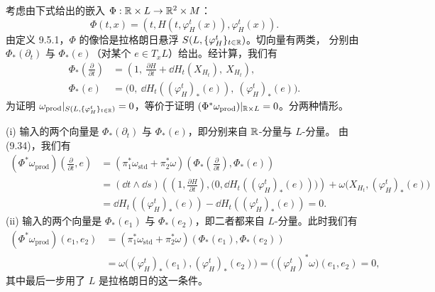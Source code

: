 \begin{wproof}
考虑由下式给出的嵌入 $\Phi:\mathbb{R}\times L\to\mathbb{R}^2\times M$：
\[
  \Phi(t,x)=(t,H(t,\varphi_H^t(x)),\varphi_H^t(x)).
\]
由定义 9.5.1，$\Phi$ 的像恰是拉格朗日悬浮 $S(L,\{\varphi_H^t\}_{t\in\mathbb{R}})$。切向量有两类，
分别由 $\Phi_*(\partial_t)$ 与 $\Phi_*(e)$（对某个 $e\in T_xL$）给出。经计算，我们有
\begin{equation}
  \begin{aligned}
    \Phi_*\left(\frac{\partial}{\partial t}\right)
      &=\left(1,\ \frac{\partial H}{\partial t}+\dd H_t(X_{H_t}),\ X_{H_t}\right),\\
    \Phi_*(e)&=\big(0,\ \dd H_t((\varphi_H^t)_*(e)),\ (\varphi_H^t)_*(e)\big).
  \end{aligned}
  \tag{9.34}
\end{equation}
为证明 $\omega_{\mathrm{prod}}|_{S(L,\{\varphi_H^t\}_{t\in\mathbb{R}})}=0$，等价于证明
$(\Phi^*\omega_{\mathrm{prod}})|_{\mathbb{R}\times L}=0$。分两种情形。

(i) 输入的两个向量是 $\Phi_*(\partial_t)$ 与 $\Phi_*(e)$，即分别来自 $\mathbb{R}$-分量与 $L$-分量。
由 (9.34)，我们有
\[
  \begin{aligned}
    (\Phi^*\omega_{\mathrm{prod}})\left(\frac{\partial}{\partial t},e\right)
    &=(\pi_1^*\omega_{\mathrm{std}}+\pi_2^*\omega)
      \left(\Phi_*\left(\frac{\partial}{\partial t}\right),\Phi_*(e)\right)\\
    &=(\dd t\wedge\dd s)\left(\left(1,\frac{\partial H}{\partial t}\right),
      \big(0,\dd H_t((\varphi_H^t)_*(e))\big)\right)
      +\omega\big(X_{H_t},(\varphi_H^t)_*(e)\big)\\
    &=\dd H_t((\varphi_H^t)_*(e))-\dd H_t((\varphi_H^t)_*(e))=0 .
  \end{aligned}
\]
(ii) 输入的两个向量是 $\Phi_*(e_1)$ 与 $\Phi_*(e_2)$，即二者都来自 $L$-分量。此时我们有
\[
  \begin{aligned}
    (\Phi^*\omega_{\mathrm{prod}})(e_1,e_2)
    &=(\pi_1^*\omega_{\mathrm{std}}+\pi_2^*\omega)(\Phi_*(e_1),\Phi_*(e_2))\\
    &=\omega\big((\varphi_H^t)_*(e_1),(\varphi_H^t)_*(e_2)\big)
      =\big((\varphi_H^t)^*\omega\big)(e_1,e_2)=0,
  \end{aligned}
\]
其中最后一步用了 $L$ 是拉格朗日的这一条件。
\end{wproof}

